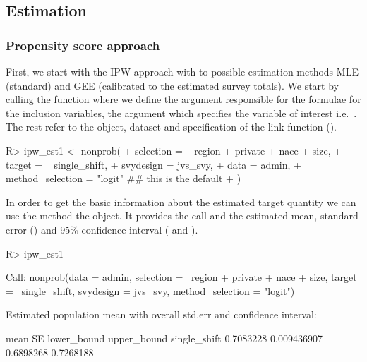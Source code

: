 \documentclass[
]{jss}
\begin{document}
\subsection{Estimation}\label{estimation}

\subsubsection{Propensity score
approach}\label{propensity-score-approach}

First, we start with the IPW approach with to possible estimation
methods MLE (standard) and GEE (calibrated to the estimated survey
totals). We start by calling the  function where we define
the  argument responsible for the formulae for the
inclusion variables, the  argument which specifies the
variable of interest i.e.~. The rest refer to the
 object, dataset and specification of the link function
().

\begin{CodeChunk}
\begin{CodeInput}
R> ipw_est1 <- nonprob(
+   selection = ~ region + private + nace + size,
+   target = ~ single_shift,
+   svydesign = jvs_svy,
+   data = admin,
+   method_selection = "logit" ## this is the default
+ )
\end{CodeInput}
\end{CodeChunk}

In order to get the basic information about the estimated target
quantity we can use the  method the object. It provides the
call and the estimated mean, standard error () and 95\%
confidence interval ( and ).

\begin{CodeChunk}
\begin{CodeInput}
R> ipw_est1
\end{CodeInput}
\begin{CodeOutput}

Call:
nonprob(data = admin, selection = ~region + private + nace + 
    size, target = ~single_shift, svydesign = jvs_svy, method_selection = "logit")

Estimated population mean with overall std.err and confidence interval:

                  mean          SE lower_bound upper_bound
single_shift 0.7083228 0.009436907   0.6898268   0.7268188
\end{CodeOutput}
\end{CodeChunk}
\end{document}
